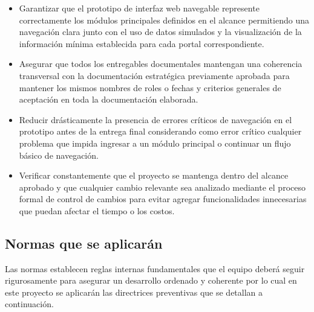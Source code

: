 \documentclass[11pt,spanish]{article}
\begin{document}
\begin{itemize}
    \item Garantizar que el prototipo de interfaz web navegable represente correctamente los módulos principales definidos en el alcance permitiendo una navegación clara junto con el uso de datos simulados y la visualización de la información mínima establecida para cada portal correspondiente.
    \item Asegurar que todos los entregables documentales mantengan una coherencia transversal con la documentación estratégica previamente aprobada para mantener los mismos nombres de roles o fechas y criterios generales de aceptación en toda la documentación elaborada.
    \item Reducir drásticamente la presencia de errores críticos de navegación en el prototipo antes de la entrega final considerando como error crítico cualquier problema que impida ingresar a un módulo principal o continuar un flujo básico de navegación.
    \item Verificar constantemente que el proyecto se mantenga dentro del alcance aprobado y que cualquier cambio relevante sea analizado mediante el proceso formal de control de cambios para evitar agregar funcionalidades innecesarias que puedan afectar el tiempo o los costos.
\end{itemize}

\subsection{Normas que se aplicarán}

Las normas establecen reglas internas fundamentales que el equipo deberá seguir rigurosamente para asegurar un desarrollo ordenado y coherente por lo cual en este proyecto se aplicarán las directrices preventivas que se detallan a continuación.
\end{document}
